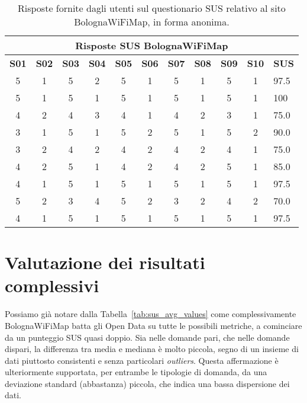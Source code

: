 \begin{center}
    \begin{table}[H]
        \centering
        \begin{tabularx}{\textwidth}{|c|c|c|c|c|c|c|c|c|c|X|}
            \hline
            \multicolumn{11}{|c|}{\textbf{Risposte SUS BolognaWiFiMap}} \\
            \hline
            \textbf{S01} & \textbf{S02} & \textbf{S03} & \textbf{S04} & \textbf{S05} & \textbf{S06} & \textbf{S07} & \textbf{S08} & \textbf{S09} & \textbf{S10} & \textbf{SUS} \\
            \hline
            5 & 1 & 5 & 2 & 5 & 1 & 5 & 1 & 5 & 1 & 97.5 \\
            5 & 1 & 5 & 1 & 5 & 1 & 5 & 1 & 5 & 1 & 100 \\
            4 & 2 & 4 & 3 & 4 & 1 & 4 & 2 & 3 & 1 & 75.0 \\
            3 & 1 & 5 & 1 & 5 & 2 & 5 & 1 & 5 & 2 & 90.0 \\
            3 & 2 & 4 & 2 & 4 & 2 & 4 & 2 & 4 & 1 & 75.0 \\
            4 & 2 & 5 & 1 & 4 & 2 & 4 & 2 & 5 & 1 & 85.0 \\
            4 & 1 & 5 & 1 & 5 & 1 & 5 & 1 & 5 & 1 & 97.5 \\
            5 & 2 & 3 & 4 & 5 & 2 & 3 & 2 & 4 & 2 & 70.0 \\
            4 & 1 & 5 & 1 & 5 & 1 & 5 & 1 & 5 & 1 & 97.5 \\
            \hline
        \end{tabularx}
        \caption[Risposte del questionario SUS sul sito BolognaWiFiMap]{Risposte fornite dagli utenti sul questionario SUS relativo al sito BolognaWiFiMap, in forma anonima.}
        \label{tab:sus_bolognawifimap}
    \end{table}
\end{center}

\section{Valutazione dei risultati complessivi}
Possiamo già notare dalla Tabella~\ref{tab:sus_avg_values} come complessivamente BolognaWiFiMap batta gli Open Data su tutte le possibili metriche, a cominciare da un punteggio SUS quasi doppio. Sia nelle domande pari, che nelle domande dispari, la differenza tra media e mediana è molto piccola, segno di un insieme di dati piuttosto consistenti e senza particolari \textit{outliers}. Questa affermazione è ulteriormente supportata, per entrambe le tipologie di domanda, da una deviazione standard (abbastanza) piccola, che indica una bassa dispersione dei dati.

